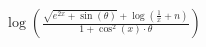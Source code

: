 \documentclass[preview]{standalone}
\begin{document}
\begin{align*}
\log\left( \frac{\sqrt{e^{2x} + \sin(\theta)} + \log\left( \frac{1}{x} + n \right)}{1 + \cos^2(x) \cdot \theta} \right)
\end{align*}
\end{document}

